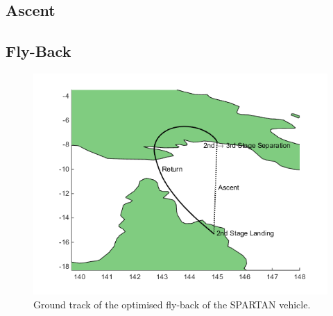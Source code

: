 \documentclass[journal]{new-aiaa} %
\begin{document}
\subsection{Ascent}

\subsection{Fly-Back}
\begin{figure}[t]
	\centering
	\includegraphics[width=0.6\linewidth]{Figures/lon-lat}
	\vspace{-10pt}
	\caption{ Ground track of the optimised fly-back of the SPARTAN vehicle.}
	\label{fig:lon-lat}
\end{figure}  
\end{document}
